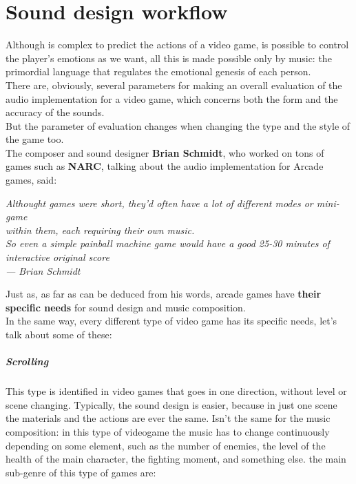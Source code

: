 
\chapter{Sound design workflow}
\label{chp:intro}

Although is complex to predict the actions of a video game, is possible to control the player's emotions as we want, all this is made possible only by music: the primordial language that regulates the emotional genesis of each person. \\
There are, obviously, several parameters for making an overall evaluation of the audio implementation for a video game, which concerns both the form and the accuracy of the sounds. \\
But the parameter of evaluation changes when changing the type and the style of the game too. \\
The composer and sound designer \textbf{Brian Schmidt}, who worked on tons of games such as \textbf{NARC}, talking about the audio implementation for Arcade games, said:
\begin{flushright}
	\itshape
	Althought games were short, they'd often have a lot of different modes or mini-game \\
	within them, each requiring their own music. \\
	So even a simple painball machine game would have a good 25-30 minutes of interactive original score\\
	\medskip
	--- Brian Schmidt
\end{flushright}

Just as, as far as can be deduced from his words, arcade games have \textbf{their specific needs} for sound design and music composition. \\
In the same way, every different type of video game has its specific needs, let's talk about some of these:

	\paragraph{Scrolling} This type is identified in video games that goes in one direction, without level or scene changing. Typically, the sound design is easier, because in just one scene the materials and the actions are ever the same. Isn't the same for the music composition: in this type of videogame the music has to change continuously depending on some element, such as the number of enemies, the level of the health of the main character, the fighting moment, and something else. the main sub-genre of this type of games are:

